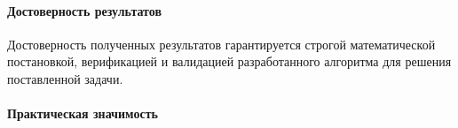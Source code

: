 \documentclass[utf8x]{G7-32} %
\begin{document}
\paragraph{Достоверность результатов}

Достоверность полученных результатов гарантируется строгой математической постановкой, верификацией и валидацией разработанного алгоритма для решения поставленной задачи.





\newpage
 
\paragraph{Практическая значимость} 
\end{document}
